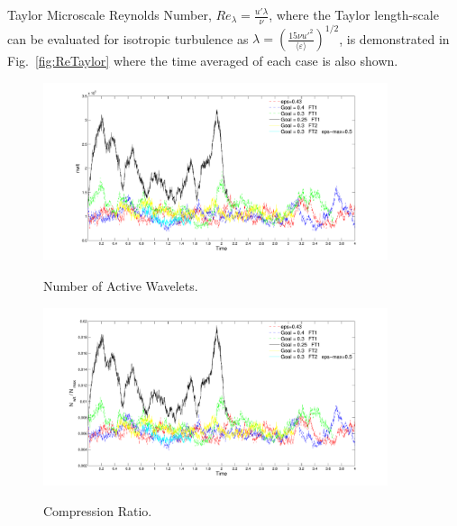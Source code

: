 Taylor Microscale Reynolds Number, $Re_{\lambda}= \frac {u'\lambda} {\nu}$,
where the Taylor length-scale can be evaluated for isotropic turbulence as
$\lambda = (\frac {15 \nu u'^2}  {\langle \varepsilon \rangle})^{1/2}$,
is demonstrated in Fig.~\ref{fig:ReTaylor} where the time averaged of each case is also shown.


\clearpage 
\newpage

\begin{figure}[t]
  \vspace{-20pt}
\begin{center}
  \includegraphics[width=0.9\textwidth]{figures/Statistics/nwlt.pdf}\\
\end{center}
  \vspace{-20pt}
  \caption{Number of Active Wavelets.}
  \label{fig:nwlt}
\end{figure}



\begin{figure}
  \vspace{-20pt}
\begin{center}
  \includegraphics[width=0.9\textwidth]{figures/Statistics/Nwlt_Nmax.pdf}\\
\end{center}
  \vspace{-20pt}
  \caption{Compression Ratio.}
  \label{fig:nwltNwlt}
\end{figure}



